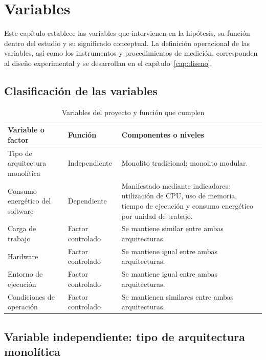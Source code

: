 \chapter{Variables}
\label{cap:variables}

Este capítulo establece las variables que intervienen en la hipótesis, su función dentro del estudio y su significado conceptual. La definición operacional de las variables, así como los instrumentos y procedimientos de medición, corresponden al diseño experimental y se desarrollan en el capítulo~\ref{cap:diseno}.

\section{Clasificación de las variables}

\begin{table}[htbp]
\centering
\caption{Variables del proyecto y función que cumplen}
\label{tab:variables}
\small
{}
\setlength{\parskip}{0pt}
\begin{tabular}{@{}p{4cm}p{3cm}p{7.2cm}@{}}
\toprule
\textbf{Variable o factor} & \textbf{Función} & \textbf{Componentes o niveles} \\
\midrule
Tipo de arquitectura monolítica & Independiente & Monolito tradicional; monolito modular. \\[3pt]
Consumo energético del software & Dependiente & Manifestado mediante indicadores: utilización de CPU, uso de memoria, tiempo de ejecución y consumo energético por unidad de trabajo. \\[3pt]
Carga de trabajo & Factor controlado & Se mantiene similar entre ambas arquitecturas. \\[3pt]
Hardware & Factor controlado & Se mantiene igual entre ambas arquitecturas. \\[3pt]
Entorno de ejecución & Factor controlado & Se mantiene igual entre ambas arquitecturas. \\[3pt]
Condiciones de operación & Factor controlado & Se mantienen similares entre ambas arquitecturas. \\
\bottomrule
\end{tabular}
\end{table}

\section{Variable independiente: tipo de arquitectura monolítica}
\label{sec:var-indep}

